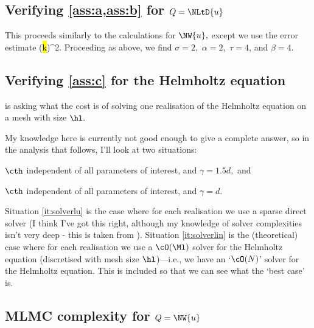 \subsection{Verifying \cref{ass:a,ass:b} for $Q = \NLtD{u}$}\label{sec:abltwo}

This proceeds similarly to the calculations for $\NW{u},$ except we use the error estimate
\beqs
{} \leq \mleft(\hl k\mright)^2.
\eeqs
Proceeding as above, we find $\sigma = 2,$ $\alpha = 2,$ $\tau = 4$, and $\beta = 4.$

%

\subsection{Verifying \cref{ass:c} for the Helmholtz equation}

 is asking what the cost is of solving one realisation of the Helmholtz equation on a mesh with size $\hl.$

My knowledge here is currently not good enough to give a complete answer, so in the analysis that follows, I'll look at two situations:

\ben[(i)]
\item\label{it:solverlu} $\cth$ independent of all parameters of interest, and $\gamma = 1.5d,$ and
\item\label{it:solverlin} $\cth$ independent of all parameters of interest, and $\gamma= d.$

Situation \ref{it:solverlu} is the case where for each realisation we use a sparse direct solver (I think I've got this right, although my knowledge of solver complexities isn't very deep - this is taken from \cite[Section 4]{ClGiScTe:11}).
Situation \ref{it:solverlin} is the (theoretical) case where for each realisation we use a $\cO(\Ml)$ solver for the Helmholtz equation (discretised with mesh size $\hl$)---i.e., we have an `$\cO(N)$' solver for the Helmholtz equation. This is included so that we can see what the `best case' is.
\een

\subsection{MLMC complexity for $Q=\NW{u}$}

